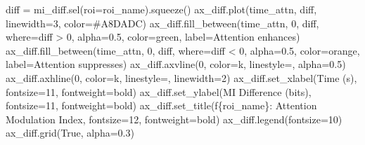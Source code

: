 \documentclass[
  11pt,
  letterpaper,
  oneside,
  openany]{book}
\newenvironment{Shaded}{\begin{snugshade}}{\end{snugshade}}
\newcommand{\DecValTok}[1]{\textcolor[rgb]{0.68,0.00,0.00}{#1}}
\newcommand{\FloatTok}[1]{\textcolor[rgb]{0.68,0.00,0.00}{#1}}
\newcommand{\NormalTok}[1]{\textcolor[rgb]{0.00,0.23,0.31}{#1}}
\newcommand{\OperatorTok}[1]{\textcolor[rgb]{0.37,0.37,0.37}{#1}}
\newcommand{\SpecialCharTok}[1]{\textcolor[rgb]{0.37,0.37,0.37}{#1}}
\newcommand{\SpecialStringTok}[1]{\textcolor[rgb]{0.13,0.47,0.30}{#1}}
\newcommand{\StringTok}[1]{\textcolor[rgb]{0.13,0.47,0.30}{#1}}
\newcommand{\VariableTok}[1]{\textcolor[rgb]{0.07,0.07,0.07}{#1}}
\begin{document}
\begin{Shaded}
\begin{Highlighting}[]
\NormalTok{    diff }\OperatorTok{=}\NormalTok{ mi\_diff.sel(roi}\OperatorTok{=}\NormalTok{roi\_name).squeeze()}
\NormalTok{    ax\_diff.plot(time\_attn, diff, linewidth}\OperatorTok{=}\DecValTok{3}\NormalTok{, color}\OperatorTok{=}\StringTok{\textquotesingle{}\#A8DADC\textquotesingle{}}\NormalTok{)}
\NormalTok{    ax\_diff.fill\_between(time\_attn, }\DecValTok{0}\NormalTok{, diff, where}\OperatorTok{=}\NormalTok{diff }\OperatorTok{\textgreater{}} \DecValTok{0}\NormalTok{, }
\NormalTok{                         alpha}\OperatorTok{=}\FloatTok{0.5}\NormalTok{, color}\OperatorTok{=}\StringTok{\textquotesingle{}green\textquotesingle{}}\NormalTok{, label}\OperatorTok{=}\StringTok{\textquotesingle{}Attention enhances\textquotesingle{}}\NormalTok{)}
\NormalTok{    ax\_diff.fill\_between(time\_attn, }\DecValTok{0}\NormalTok{, diff, where}\OperatorTok{=}\NormalTok{diff }\OperatorTok{\textless{}} \DecValTok{0}\NormalTok{,}
\NormalTok{                         alpha}\OperatorTok{=}\FloatTok{0.5}\NormalTok{, color}\OperatorTok{=}\StringTok{\textquotesingle{}orange\textquotesingle{}}\NormalTok{, label}\OperatorTok{=}\StringTok{\textquotesingle{}Attention suppresses\textquotesingle{}}\NormalTok{)}
\NormalTok{    ax\_diff.axvline(}\DecValTok{0}\NormalTok{, color}\OperatorTok{=}\StringTok{\textquotesingle{}k\textquotesingle{}}\NormalTok{, linestyle}\OperatorTok{=}\StringTok{\textquotesingle{}{-}{-}\textquotesingle{}}\NormalTok{, alpha}\OperatorTok{=}\FloatTok{0.5}\NormalTok{)}
\NormalTok{    ax\_diff.axhline(}\DecValTok{0}\NormalTok{, color}\OperatorTok{=}\StringTok{\textquotesingle{}k\textquotesingle{}}\NormalTok{, linestyle}\OperatorTok{=}\StringTok{\textquotesingle{}{-}\textquotesingle{}}\NormalTok{, linewidth}\OperatorTok{=}\DecValTok{2}\NormalTok{)}
\NormalTok{    ax\_diff.set\_xlabel(}\StringTok{\textquotesingle{}Time (s)\textquotesingle{}}\NormalTok{, fontsize}\OperatorTok{=}\DecValTok{11}\NormalTok{, fontweight}\OperatorTok{=}\StringTok{\textquotesingle{}bold\textquotesingle{}}\NormalTok{)}
\NormalTok{    ax\_diff.set\_ylabel(}\StringTok{\textquotesingle{}MI Difference (bits)\textquotesingle{}}\NormalTok{, fontsize}\OperatorTok{=}\DecValTok{11}\NormalTok{, fontweight}\OperatorTok{=}\StringTok{\textquotesingle{}bold\textquotesingle{}}\NormalTok{)}
\NormalTok{    ax\_diff.set\_title(}\SpecialStringTok{f\textquotesingle{}}\SpecialCharTok{\{}\NormalTok{roi\_name}\SpecialCharTok{\}}\SpecialStringTok{: Attention Modulation Index\textquotesingle{}}\NormalTok{, fontsize}\OperatorTok{=}\DecValTok{12}\NormalTok{, fontweight}\OperatorTok{=}\StringTok{\textquotesingle{}bold\textquotesingle{}}\NormalTok{)}
\NormalTok{    ax\_diff.legend(fontsize}\OperatorTok{=}\DecValTok{10}\NormalTok{)}
\NormalTok{    ax\_diff.grid(}\VariableTok{True}\NormalTok{, alpha}\OperatorTok{=}\FloatTok{0.3}\NormalTok{)}


\end{Highlighting}
\end{Shaded}
\end{document}
